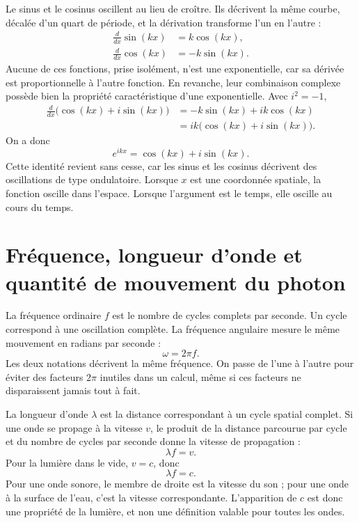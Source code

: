 Le sinus et le cosinus oscillent au lieu de croître. Ils décrivent la même courbe, décalée d’un quart de période, et la dérivation transforme l’un en l’autre :
\begin{align}
\frac{d}{dx}\sin(kx)&=k\cos(kx),\\
\frac{d}{dx}\cos(kx)&=-k\sin(kx).
\end{align}
Aucune de ces fonctions, prise isolément, n’est une exponentielle, car sa dérivée est proportionnelle à l’autre fonction. En revanche, leur combinaison complexe possède bien la propriété caractéristique d’une exponentielle. Avec \(i^2=-1\),
\begin{align}
\frac{d}{dx}\bigl(\cos(kx)+i\sin(kx)\bigr)
&=-k\sin(kx)+ik\cos(kx)\\
&=ik\bigl(\cos(kx)+i\sin(kx)\bigr).
\end{align}
On a donc
\begin{equation}
e^{ikx}=\cos(kx)+i\sin(kx).
\end{equation}
Cette identité revient sans cesse, car les sinus et les cosinus décrivent des oscillations de type ondulatoire. Lorsque \(x\) est une coordonnée spatiale, la fonction oscille dans l’espace. Lorsque l’argument est le temps, elle oscille au cours du temps.

\section{Fréquence, longueur d’onde et quantité de mouvement du photon}

La fréquence ordinaire \(f\) est le nombre de cycles complets par seconde. Un cycle correspond à une oscillation complète. La fréquence angulaire mesure le même mouvement en radians par seconde :
\begin{equation}
\omega=2\pi f.
\end{equation}
Les deux notations décrivent la même fréquence. On passe de l’une à l’autre pour éviter des facteurs \(2\pi\) inutiles dans un calcul, même si ces facteurs ne disparaissent jamais tout à fait.

La longueur d’onde \(\lambda\) est la distance correspondant à un cycle spatial complet. Si une onde se propage à la vitesse \(v\), le produit de la distance parcourue par cycle et du nombre de cycles par seconde donne la vitesse de propagation :
\begin{equation}
\lambda f=v.
\end{equation}
Pour la lumière dans le vide, \(v=c\), donc
\begin{equation}
\lambda f=c.
\end{equation}
Pour une onde sonore, le membre de droite est la vitesse du son ; pour une onde à la surface de l’eau, c’est la vitesse correspondante. L’apparition de \(c\) est donc une propriété de la lumière, et non une définition valable pour toutes les ondes.

